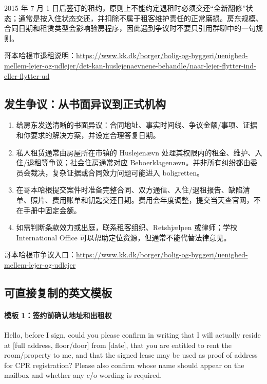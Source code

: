 2015 年 7 月 1 日后签订的租约，原则上不能约定退租时必须交还“全新翻修”状态；通常是按入住状态交还，并扣除不属于租客维护责任的正常磨损。房东规模、合同日期和租赁类型会影响验房程序，因此遇到争议时不要只引用群聊中的一句规则。

哥本哈根市退租说明：\url{https://www.kk.dk/borger/bolig-og-byggeri/uenighed-mellem-lejer-og-udlejer/det-kan-huslejenaevnene-behandle/naar-lejer-flytter-ind-eller-flytter-ud}

\subsection{发生争议：从书面异议到正式机构}

\begin{enumerate}[leftmargin=2.2em,itemsep=3pt]
  \item 给房东发送清晰的书面异议：合同地址、事实时间线、争议金额/事项、证据和你要求的解决方案，并设定合理答复日期。
  \item 私人租赁通常由房屋所在市镇的 Huslejenævn 处理其权限内的租金、维护、入住/退租等争议；社会住房通常对应 Beboerklagenævn。并非所有纠纷都由委员会裁决，复杂证据或合同效力问题可能进入 boligretten。
  \item 在哥本哈根提交案件时准备完整合同、双方通信、入住/退租报告、缺陷清单、照片、费用账单和钥匙交还日期。费用会年度调整，提交当天查官网，不在手册中固定金额。
  \item 如需判断条款效力或出庭，联系租客组织、Retshjælpen 或律师；学校 International Office 可以帮助定位资源，但通常不能代替法律意见。
\end{enumerate}

哥本哈根市争议入口：\url{https://www.kk.dk/borger/bolig-og-byggeri/uenighed-mellem-lejer-og-udlejer}

\subsection{可直接复制的英文模板}

\paragraph{模板 1：签约前确认地址和出租权}

\begin{grayleftbox}
Hello, before I sign, could you please confirm in writing that I will actually reside at [full address, floor/door] from [date], that you are entitled to rent the room/property to me, and that the signed lease may be used as proof of address for CPR registration? Please also confirm whose name should appear on the mailbox and whether any c/o wording is required.
\end{grayleftbox}

